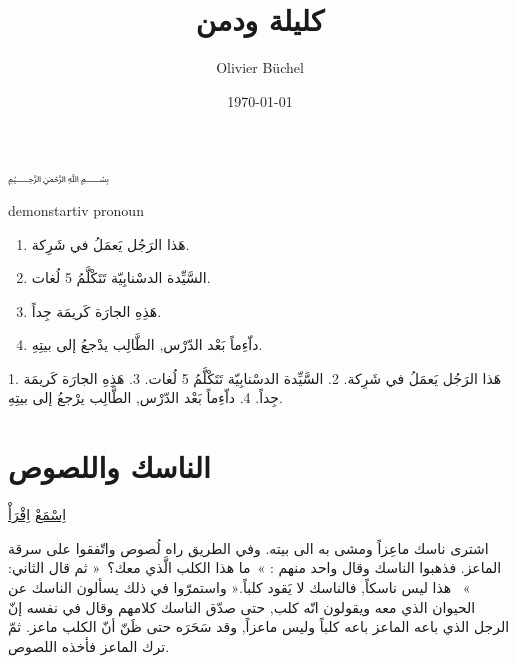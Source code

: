\documentclass[a4paper]{article}
\title{كليلة ودمن}
\author{Olivier Büchel}
\date{\today}
\begin{document}
\maketitle
﷽

demonstartiv pronoun

\begin{enumerate}
\item  هَذا الرَجُل يَعمَلُ في شَرِكة.
\item  السَّيِّدة الدسْنابِيّة تَتَكْلَّمُ 5 لُغات.
\item هَذِهِ الجارَة كَريمَة جِداً.
\item  داّءِماً بَعْد الدّرْس, الطَّالِب يدْجعُ  إلى بيتِهِ.

\end{enumerate}

1. هَذا الرَجُل يَعمَلُ في شَرِكة.
2. السَّيِّدة الدسْنابِيّة تَتَكْلَّمُ 5 لُغات.
3. هَذِهِ الجارَة كَريمَة جِداً.
4. داّءِماً بَعْد الدّرْس, الطَّالِب يرْجعُ  إلى بيتِهِ.


\section{الناسك واللصوص }
\href{run:/home/olivier/arab/kalilawadimna/audio/B12-MuntherA.Younes-.mp3}{اِسْمَعْ}
\href{run:/home/olivier/arab/kalilawadimna/Tales\_from\_Kalila\_Wa\_Dimna\_al3arabiya.pdf\#page=118}{اِقْرَأْ}



\begin{large}
{\begin{multicols}{3}\noindent
  اشترى ناسك ماعِزاً ومشى به الى بيته. وفي الطريق راه لُصوص واتّفقوا على سرقة الماعز. فذهبوا الناسك وقال واحد منهم : »~ما هذا الكلب الَّذي معك؟~« ثم قال الثاني: »~ هذا ليس ناسكاً, فالناسك لا يَقود كلباً.« واستمرّوا في ذلك يسألون الناسك عن الحيوان الذي معه ويقولون انّه كلب, حتى صدّق الناسك كلامهم وقال في نفسه إنّ الرجل الذي باعه الماعز باعه كلباً وليس ماعزاً, وقد سَحَرَه حتى ظَنّ أنّ الكلب ماعز. ثمّ ترك الماعز فأخذه اللصوص.
\end{multicols}  }
\end{large}
\end{document}
